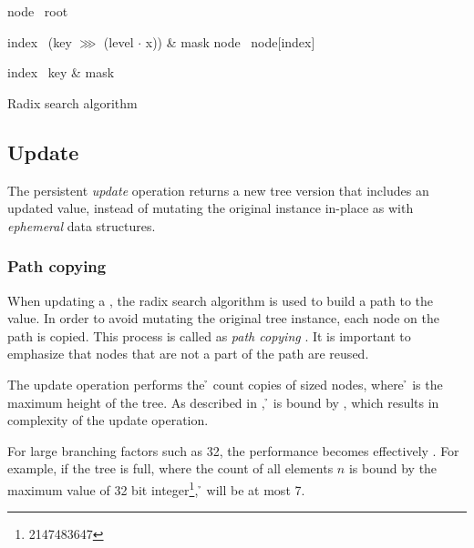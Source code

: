 \begin{listing}[ht!]

    \begin{algorithmic}[1]
            \State node \la\ root

                \State index \la\ (key $\ggg$ (level $\cdot$ x)) \& mask
                \State node \la\ node[index]
            \EndFor

            \State index \la\ key \& mask
            \State {}
        \EndFunction
    \end{algorithmic}

    \caption{Radix search algorithm}
    \label{lst:rb-tree-radix-search}
\end{listing}

\subsection{Update}
The persistent \emph{update} operation returns a new tree version that includes an updated value, instead of mutating the original instance in-place as with \emph{ephemeral} data structures.

\subsubsection*{Path copying}
When updating a \treerb{}, the radix search algorithm is used to build a path to the value. In order to avoid mutating the original tree instance, each node on the path is copied. This process is called as \emph{path copying} \cite{planar-point-location}. It is important to emphasize that nodes that are not a part of the path are reused.

The update operation performs the \h{} count copies of \m{} sized nodes, where \h{} is the maximum height of the tree. As described in , \h{} is bound by , which results in {} complexity of the update operation.

For large branching factors \m{} such as 32, the performance becomes effectively . For example, if the tree is full, where the count of all elements $n$ is bound by the maximum value of 32 bit integer\footnote{2147483647}, \h{} will be at most 7.

